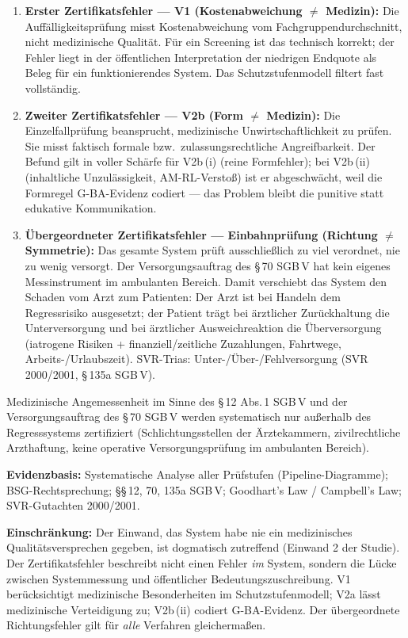 \documentclass{umbruch-position}
\begin{document}
\begin{enumerate}
  \item \textbf{Erster Zertifikatsfehler --- V1 (Kostenabweichung $\neq$ Medizin):} Die Auff\"alligkeitspr\"ufung misst Kostenabweichung vom Fachgruppendurchschnitt, nicht medizinische Qualit\"at. F\"ur ein Screening ist das technisch korrekt; der Fehler liegt in der \"offentlichen Interpretation der niedrigen Endquote als Beleg f\"ur ein \glqq{}funktionierendes System\grqq{}. Das Schutzstufenmodell filtert fast vollst\"andig.
  \item \textbf{Zweiter Zertifikatsfehler --- V2b (Form $\neq$ Medizin):} Die Einzelfallpr\"ufung beansprucht, medizinische Unwirtschaftlichkeit zu pr\"ufen. Sie misst faktisch formale bzw.\ zulassungsrechtliche Angreifbarkeit. Der Befund gilt in voller Sch\"arfe f\"ur V2b\,(i) (reine Formfehler); bei V2b\,(ii) (inhaltliche Unzul\"assigkeit, AM-RL-Versto\ss{}) ist er abgeschw\"acht, weil die Formregel G-BA-Evidenz codiert --- das Problem bleibt die punitive statt edukative Kommunikation.
  \item \textbf{\"Ubergeordneter Zertifikatsfehler --- Einbahnpr\"ufung (Richtung $\neq$ Symmetrie):} Das gesamte System pr\"uft ausschlie\ss{}lich \glqq{}zu viel verordnet\grqq{}, nie \glqq{}zu wenig versorgt\grqq{}. Der Versorgungsauftrag des \S\,70 SGB\,V hat kein eigenes Messinstrument im ambulanten Bereich. Damit verschiebt das System den Schaden vom Arzt zum Patienten: Der Arzt ist bei Handeln dem Regressrisiko ausgesetzt; der Patient tr\"agt bei \"arztlicher Zur\"uckhaltung die Unterversorgung und bei \"arztlicher Ausweichreaktion die \"Uberversorgung (iatrogene Risiken + finanziell/zeitliche Zuzahlungen, Fahrtwege, Arbeits-/Urlaubszeit). SVR-Trias: Unter-/\"Uber-/Fehlversorgung (SVR 2000/2001, \S\,135a SGB\,V).
\end{enumerate}

Medizinische Angemessenheit im Sinne des \S\,12 Abs.\,1 SGB\,V und der Versorgungsauftrag des \S\,70 SGB\,V werden systematisch nur au\ss{}erhalb des Regresssystems zertifiziert (Schlichtungsstellen der \"Arztekammern, zivilrechtliche Arzthaftung, keine operative Versorgungspr\"ufung im ambulanten Bereich).

\textbf{Evidenzbasis:} Systematische Analyse aller Pr\"ufstufen (Pipeline-Diagramme); BSG-Rechtsprechung; \S\S\,12, 70, 135a SGB\,V; Goodhart's Law / Campbell's Law; SVR-Gutachten 2000/2001.

\textbf{Einschr\"ankung:} Der Einwand, das System habe nie ein medizinisches Qualit\"atsversprechen gegeben, ist dogmatisch zutreffend (Einwand 2 der Studie). Der Zertifikatsfehler beschreibt nicht einen Fehler \textit{im} System, sondern die L\"ucke zwischen Systemmessung und \"offentlicher Bedeutungszuschreibung. V1 ber\"ucksichtigt medizinische Besonderheiten im Schutzstufenmodell; V2a l\"asst medizinische Verteidigung zu; V2b\,(ii) codiert G-BA-Evidenz. Der \"ubergeordnete Richtungsfehler gilt f\"ur \emph{alle} Verfahren gleicherma\ss{}en.
\end{document}

